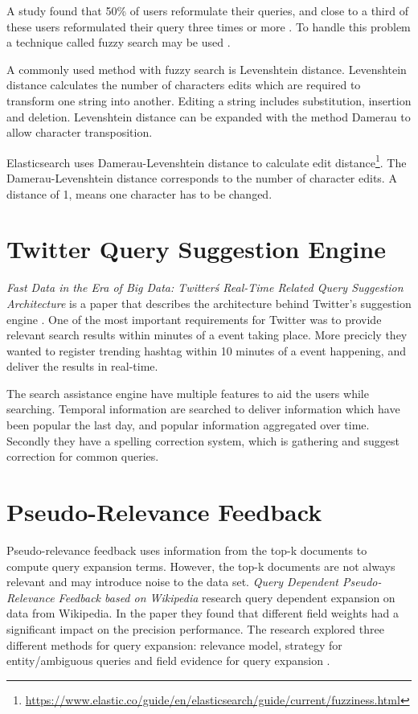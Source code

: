 A study found that 50\% of users reformulate their queries, and close to a third of these users reformulated their query three times or more \cite{query-reformulate}.
To handle this problem a technique called fuzzy search may be used \cite{fuzzy-search}.

A commonly used method with fuzzy search is Levenshtein distance.
Levenshtein distance calculates the number of characters edits which are required to transform one string into another.
Editing a string includes substitution, insertion and deletion.
Levenshtein distance can be expanded with the method Damerau to allow character transposition.

Elasticsearch uses Damerau-Levenshtein distance to calculate edit distance\footnote{\url{https://www.elastic.co/guide/en/elasticsearch/guide/current/fuzziness.html}}.
The Damerau-Levenshtein distance corresponds to the number of character edits.
A distance of 1, means one character has to be changed.

\section{Twitter Query Suggestion Engine}
\textit{Fast Data in the Era of Big Data: Twitter\'s Real-Time Related Query Suggestion Architecture} is a paper that describes the architecture behind Twitter's suggestion engine \cite{twitter-suggestion}.
One of the most important requirements for Twitter was to provide relevant search results within minutes of a event taking place.
More precicly they wanted to register trending hashtag within 10 minutes of a event happening, and deliver the results in real-time.

The search assistance engine have multiple features to aid the users while searching.
Temporal information are searched to deliver information which have been popular the last day, and popular information aggregated over time.
Secondly they have a spelling correction system, which is gathering and suggest correction for common queries.

\section{Pseudo-Relevance Feedback}
Pseudo-relevance feedback uses information from the top-k documents to compute query expansion terms.
However, the top-k documents are not always relevant and may introduce noise to the data set.
\textit{Query Dependent Pseudo-Relevance Feedback based on Wikipedia} research query dependent expansion on data from Wikipedia.
In the paper they found that different field weights had a significant impact on the precision performance.
The research explored three different methods for query expansion:
relevance model, strategy for entity/ambiguous queries and field evidence for query expansion \cite{pseudo-relevance-wikipedia}.
